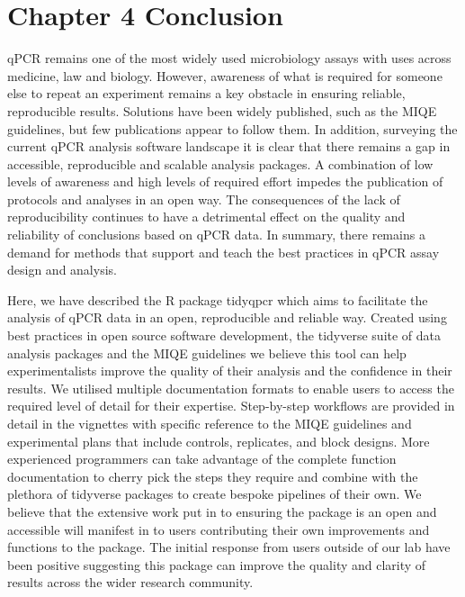 \documentclass[../main.tex]{subfiles}
\begin{document}
\section{Chapter 4 Conclusion}

qPCR remains one of the most widely used microbiology assays with uses across medicine, law and biology. However, awareness of what is required for someone else to repeat an experiment remains a key obstacle in ensuring reliable, reproducible results. 
Solutions have been widely published, such as the MIQE guidelines, but few publications appear to follow them. 
In addition, surveying the current qPCR analysis software landscape it is clear that there remains a gap in accessible, reproducible and scalable analysis packages. 
A combination of low levels of awareness and high levels of required effort impedes the publication of protocols and analyses in an open way. 
The consequences of the lack of reproducibility continues to have a detrimental effect on the quality and reliability of conclusions based on qPCR data. 
In summary, there remains a demand for methods that support and teach the best practices in qPCR assay design and analysis.


Here, we have described the R package tidyqpcr which aims to facilitate the analysis of qPCR data in an open, reproducible and reliable way. 
Created using best practices in open source software development, the tidyverse suite of data analysis packages and the MIQE guidelines we believe this tool can help experimentalists improve the quality of their analysis and the confidence in their results.
We utilised multiple documentation formats to enable users to access the required level of detail for their expertise. 
Step-by-step workflows are provided in detail in the vignettes with specific reference to the MIQE guidelines and experimental plans that include controls, replicates, and block designs. 
More experienced programmers can take advantage of the complete function documentation to cherry pick the steps they require and combine with the plethora of tidyverse packages to create bespoke pipelines of their own.
We believe that the extensive work put in to ensuring the package is an open and accessible will manifest in to users contributing their own improvements and functions to the package. 
The initial response from users outside of our lab have been positive suggesting this package can improve the quality and clarity of results across the wider research community.
\end{document}
